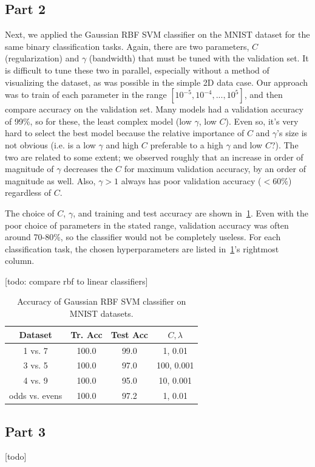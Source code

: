 \subsection{Part 2}
Next, we applied the Gaussian RBF SVM classifier on the MNIST dataset for the same binary classification tasks.
Again, there are two parameters, $C$ (regularization) and $\gamma$ (bandwidth) that must be tuned with the validation set.
It is difficult to tune these two in parallel, especially without a method of visualizing the dataset, as was possible in the simple 2D data case.
Our approach was to train of each parameter in the range $[10^{-5}, 10^{-4}, ..., 10^{5}]$, and then compare accuracy on the validation set.
Many models had a validation accuracy of 99\%, so for these, the least complex model (low $\gamma$, low $C$).
Even so, it's very hard to select the best model because the relative importance of $C$ and $\gamma$'s size is not obvious (i.e. is a low $\gamma$ and high $C$ preferable to a high $\gamma$ and low $C$?).
The two are related to some extent; we observed roughly that an increase in order of magnitude of $\gamma$ decreases the $C$ for maximum validation accuracy, by an order of magnitude as well.
Also, $\gamma>1$ always has poor validation accuracy ($<60\%$) regardless of $C$.

The choice of $C$, $\gamma$, and training and test accuracy are shown in~\cref{table_4_2}.
Even with the poor choice of parameters in the stated range, validation accuracy was often around 70-80\%, so the classifier would not be completely useless.
For each classification task, the chosen hyperparameters are listed in~\cref{table_4_2}'s rightmost column.



[todo: compare rbf to linear classifiers]

\begin{table}[ht!]
\centering
\begin{tabular}{||c c c c||}  
 \hline
 Dataset & Tr. Acc & Test Acc & $C, \lambda$ \\ [0.3ex] 
 \hline\hline
 1 vs. 7 & 100.0 & 99.0 & 1, 0.01 \\ 
 \hline
 3 vs. 5 & 100.0 & 97.0 & 100, 0.001 \\ 
 \hline
 4 vs. 9 & 100.0 & 95.0 & 10, 0.001 \\ 
 \hline
 odds vs. evens & 100.0 & 97.2 & 1, 0.01 \\ 
 \hline
\end{tabular}
\caption{Accuracy of Gaussian RBF SVM classifier on MNIST datasets.}
\label{table_4_2}
\end{table}

\subsection{Part 3}
[todo]

